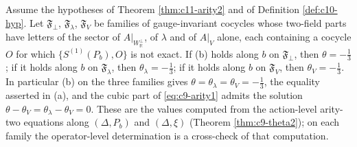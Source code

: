 \begin{proposition}
\label{prop:c11-theta-sector}
Assume the hypotheses of Theorem \ref{thm:c11-arity2} and of Definition \ref{def:c10-hyp}. Let $\mathfrak F_\perp$, $\mathfrak F_\lambda$, $\mathfrak F_V$ be families of gauge-invariant cocycles whose two-field parts have letters of the sector of $A|_{W_{\mathbb R}^\perp}$, of $\lambda$ and of $A|_V$ alone, each containing a cocycle $O$ for which $\{S^{(1)}(P_b),O\}$ is not exact. If (b) holds along $b$ on $\mathfrak F_\perp$, then $\theta=-\tfrac13$; if it holds along $b$ on $\mathfrak F_\lambda$, then $\theta_\lambda=-\tfrac13$; if it holds along $b$ on $\mathfrak F_V$, then $\theta_V=-\tfrac13$. In particular (b) on the three families gives $\theta=\theta_\lambda=\theta_V=-\tfrac13$, the equality asserted in (a), and the cubic part of \eqref{eq:c9-arity1} admits the solution $\theta-\theta_V=\theta_\lambda-\theta_V=0$. These are the values computed from the action-level arity-two equations along $(\Delta,P_b)$ and $(\Delta,\xi)$ (Theorem \ref{thm:c9-theta2}); on each family the operator-level determination is a cross-check of that computation.
\end{proposition}
